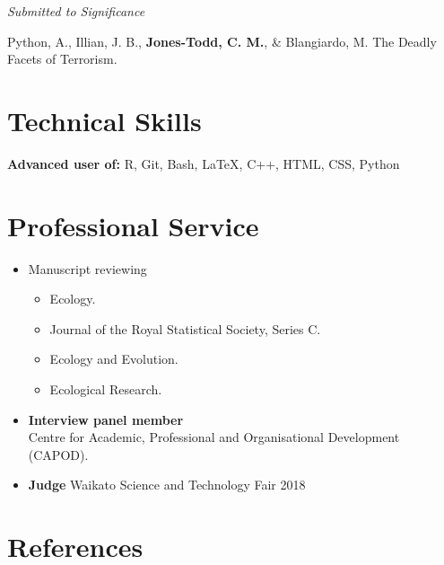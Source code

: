 \documentclass[10pt,a4paper]{moderncv}
\begin{document}
\vspace{5pt}

\textit{\small{Submitted to Significance}}\\

\vspace{-3pt}

Python, A.,  Illian, J. B., \textbf{Jones-Todd, C. M.}, \& Blangiardo, M. The Deadly Facets of Terrorism.\\

\vspace{5pt}

\section{Technical Skills}

\vspace{6pt}
    \textbf{Advanced user of:} R, Git, Bash, \LaTeX, C++, HTML, CSS, Python


\section{Professional Service}

\vspace{6pt}

\begin{itemize}
\item Manuscript reviewing
  \begin{itemize}
  \item Ecology.
  \item Journal of the Royal Statistical Society, Series C.
  \item  Ecology and Evolution.
  \item  Ecological Research.
  \end{itemize}
  \item \textbf{Interview panel member}\\
    Centre for Academic, Professional and Organisational Development (CAPOD).
    
  \item \textbf{Judge} Waikato Science and Technology Fair 2018
  \end{itemize}

\newpage
\section{References}
\end{document}
